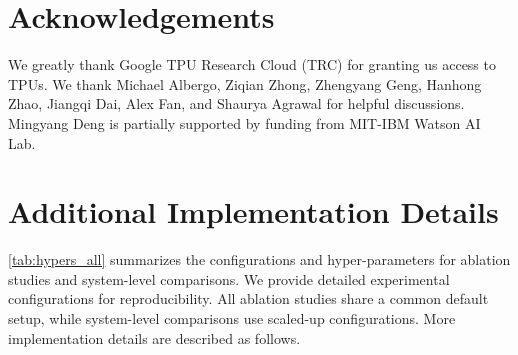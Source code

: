 \documentclass{article}
\theoremstyle{plain}
\theoremstyle{definition}
\theoremstyle{remark}
\begin{document}
\vfill



\section*{Acknowledgements}
We greatly thank Google TPU Research Cloud (TRC) for granting us access to TPUs. We thank Michael Albergo, Ziqian Zhong, Zhengyang Geng, Hanhong Zhao, Jiangqi Dai, Alex Fan, and Shaurya Agrawal for helpful discussions. Mingyang Deng is partially supported by funding from MIT-IBM Watson AI Lab.






\clearpage
\newpage
\appendix
\section{Additional Implementation Details}
\label{sec:appendix_impl}

\cref{tab:hypers_all} summarizes the configurations and hyper-parameters for ablation studies and system-level comparisons.
We provide detailed experimental configurations for reproducibility. All ablation studies share a common default setup, while system-level comparisons use scaled-up configurations. More implementation details are described as follows.
\end{document}
